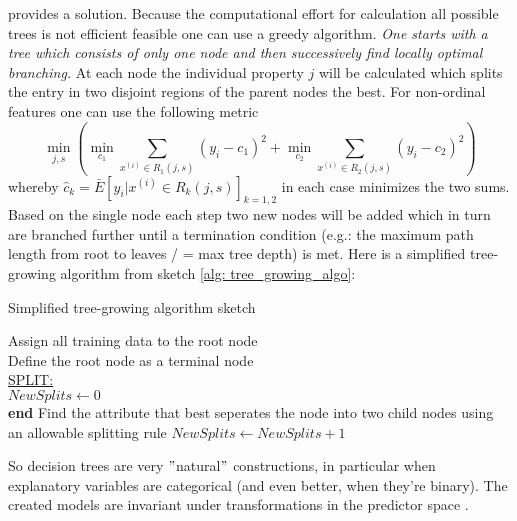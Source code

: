 \documentclass[12pt, a4paper]{article}
\begin{document}
provides a solution. Because the computational effort for calculation all possible trees is not efficient feasible one can use a greedy algorithm. 
\textit{
One starts with a tree which consists of only one node and then successively find locally optimal branching.
}At each node the individual property $j$ will be calculated which splits the entry in two disjoint regions of the parent nodes the best. For non-ordinal features one can use the following metric
\begin{equation}
    \underset{ j,s }{\min} \left( 
    \underset{ c_1 }{\min} 
    \sum_{x^{(i)} \in R_1(j,s)} (y_i - c_1)^2 + 
    \underset{ c_2 }{\min} 
    \sum_{x^{(i)} \in R_2(j,s)} (y_i - c_2)^2
    \right)
\end{equation}
whereby $\hat{c}_k = \bar{E}[y_i | x^{(i)} \in R_k(j,s)]_{k = 1,2}$ in each case minimizes the two sums. Based on the single node each step two new nodes will be added which in turn are branched further until a termination condition (e.g.: the maximum path length from root to leaves / = max tree depth) is met. Here is a simplified tree-growing algorithm from sketch \ref{alg: tree_growing_algo}:
\begin{algorithm}
\caption{Simplified tree-growing algorithm sketch}\label{alg: tree_growing_algo}
    Assign all training data to the root node \\
    Define the root node as a terminal node \\
    \underline{SPLIT:} \\
    $NewSplits \gets 0$ \\
    {
        {\textbf{end}}
        {Find the attribute that best seperates the node into two child nodes using an allowable splitting rule}
        $NewSplits \gets NewSplits + 1$\;
    }
\end{algorithm}
So decision trees are very $"$natural$"$ constructions, in particular when explanatory variables are categorical (and even better, when they're binary). The created models are invariant under transformations in the predictor space \cite{Breiman1984}. 

\newpage
\end{document}
